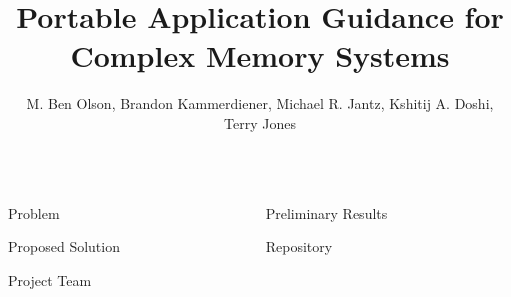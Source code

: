 \documentclass[final,hyperref={pdfpagelabels=false}]{beamer}
\title{Portable Application Guidance for Complex Memory Systems}
\author{M. Ben Olson, Brandon Kammerdiener, Michael R. Jantz, Kshitij A. Doshi, Terry Jones}
\begin{document}
\begin{frame}{}
\begin{columns}[t]
  \begin{column}{.45\linewidth}

    \begin{block}{Problem}
    \end{block}
    
    \begin{block}{Proposed Solution}
    \end{block}
    
    \begin{block}{Project Team}
    \end{block}
  \end{column}
  
  \begin{column}{.45\linewidth}

    \begin{block}{Preliminary Results}
    \end{block}
    
    \begin{block}{Repository}
    \end{block}

  \end{column}
\end{columns}
\end{frame}
\end{document}
